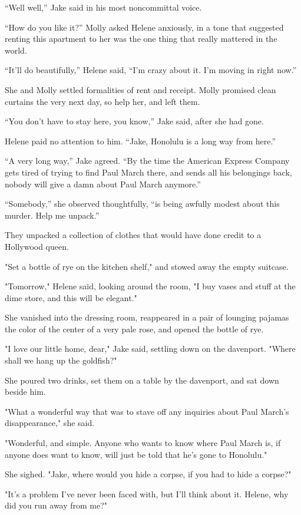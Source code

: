\documentclass{novel}
\begin{document}
“Well well,” Jake said in his most noncommittal voice.

“How do you like it?” Molly asked Helene anxiously, in a tone that suggested renting this apartment to her was the one thing that really mattered in the world.

“It’ll do beautifully,” Helene said, “I’m crazy about it. I’m moving in right now.”

She and Molly settled formalities of rent and receipt. Molly promised clean curtains the very next day, so help her, and left them.

“You don’t have to stay here, you know,” Jake said, after she had gone.

Helene paid no attention to him. “Jake, Honolulu is a long way from here.”

“A very long way,” Jake agreed. “By the time the American Express Company gets tired of trying to find Paul March there, and sends all his belongings back, nobody will give a damn about Paul March anymore.”

“Somebody,” she observed thoughtfully, “is being awfully modest about this murder. Help me unpack.”

They unpacked a collection of clothes that would have done credit to a Hollywood queen.

"Set a bottle of rye on the kitchen shelf," and stowed away the empty suitcase.

"Tomorrow," Helene said, looking around the room, "I buy vases and stuff at the dime store, and this will be elegant."

She vanished into the dressing room, reappeared in a pair of lounging pajamas the color of the center of a very pale rose, and opened the bottle of rye.

"I love our little home, dear," Jake said, settling down on the davenport. "Where shall we hang up the goldfish?"

She poured two drinks, set them on a table by the davenport, and sat down beside him.

"What a wonderful way that was to stave off any inquiries about Paul March's disappearance," she said.

"Wonderful, and simple. Anyone who wants to know where Paul March is, if anyone does want to know, will just be told that he's gone to Honolulu."

She sighed. "Jake, where would you hide a corpse, if you had to hide a corpse?"

"It's a problem I've never been faced with, but I'll think about it. Helene, why did you run away from me?"
\end{document}

